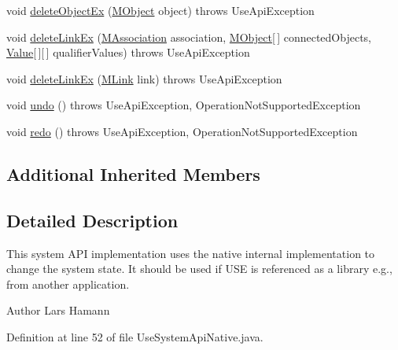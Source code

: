 \begin{DoxyCompactItemize}
\item 
void \hyperlink{classorg_1_1tzi_1_1use_1_1api_1_1impl_1_1_use_system_api_native_a4444dccb0d1047043780910af04a1f2e}{delete\-Object\-Ex} (\hyperlink{interfaceorg_1_1tzi_1_1use_1_1uml_1_1sys_1_1_m_object}{M\-Object} object)  throws Use\-Api\-Exception 
\item 
void \hyperlink{classorg_1_1tzi_1_1use_1_1api_1_1impl_1_1_use_system_api_native_a28b19940aed436f55da3ebd19118a5ce}{delete\-Link\-Ex} (\hyperlink{interfaceorg_1_1tzi_1_1use_1_1uml_1_1mm_1_1_m_association}{M\-Association} association, \hyperlink{interfaceorg_1_1tzi_1_1use_1_1uml_1_1sys_1_1_m_object}{M\-Object}\mbox{[}$\,$\mbox{]} connected\-Objects, \hyperlink{classorg_1_1tzi_1_1use_1_1uml_1_1ocl_1_1value_1_1_value}{Value}\mbox{[}$\,$\mbox{]}\mbox{[}$\,$\mbox{]} qualifier\-Values)  throws Use\-Api\-Exception 
\item 
void \hyperlink{classorg_1_1tzi_1_1use_1_1api_1_1impl_1_1_use_system_api_native_aa209ba0d56272c7bac95cc934b4b240e}{delete\-Link\-Ex} (\hyperlink{interfaceorg_1_1tzi_1_1use_1_1uml_1_1sys_1_1_m_link}{M\-Link} link)  throws Use\-Api\-Exception 
\item 
void \hyperlink{classorg_1_1tzi_1_1use_1_1api_1_1impl_1_1_use_system_api_native_afacfa9ddc2038945b34be1df28f5bffb}{undo} ()  throws Use\-Api\-Exception, Operation\-Not\-Supported\-Exception 
\item 
void \hyperlink{classorg_1_1tzi_1_1use_1_1api_1_1impl_1_1_use_system_api_native_a8479d746dc6c4b8259bc87b367454c31}{redo} ()  throws Use\-Api\-Exception, Operation\-Not\-Supported\-Exception 
\end{DoxyCompactItemize}
\subsection*{Additional Inherited Members}


\subsection{Detailed Description}
This system A\-P\-I implementation uses the native internal implementation to change the system state. It should be used if U\-S\-E is referenced as a library e.\-g., from another application. \begin{DoxyAuthor}{Author}
Lars Hamann 
\end{DoxyAuthor}


Definition at line 52 of file Use\-System\-Api\-Native.\-java.



